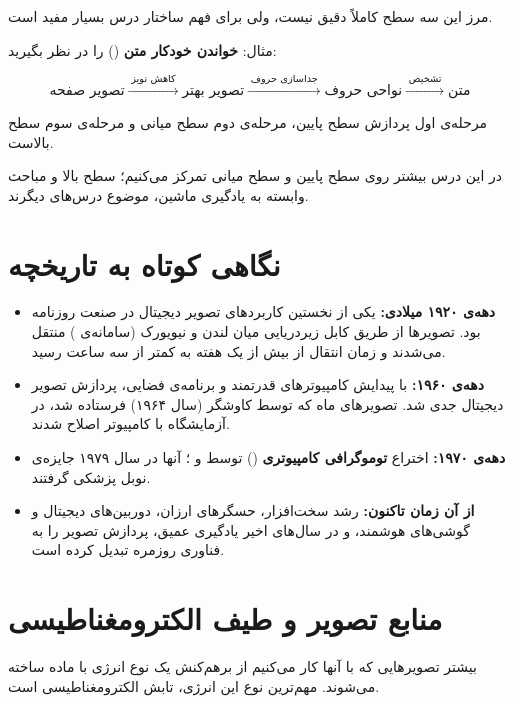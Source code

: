 \documentclass[11pt,a4paper]{article}
\begin{document}
	مرز این سه سطح کاملاً دقیق نیست، ولی برای فهم ساختار درس بسیار مفید است.
	
	مثال: \textbf{خواندن خودکار متن} () را در نظر بگیرید:
	
	\[
	\boxed{
		\text{تصویر صفحه}
		\xrightarrow{\;\text{کاهش نویز}\;}
		\text{تصویر بهتر}
		\xrightarrow{\;\text{جداسازی حروف}\;}
		\text{نواحی حروف}
		\xrightarrow{\;\text{تشخیص}\;}
		\text{متن}
	}
	\]
	
	مرحله‌ی اول پردازش سطح پایین، مرحله‌ی دوم سطح میانی و مرحله‌ی سوم سطح بالاست.
	
	در این درس بیشتر روی سطح پایین و سطح میانی تمرکز می‌کنیم؛
	سطح بالا و مباحث وابسته به یادگیری ماشین، موضوع درس‌های دیگرند.
	
	
	\section{نگاهی کوتاه به تاریخچه}
	
	\begin{itemize}
		\item \textbf{دهه‌ی ۱۹۲۰ میلادی:} یکی از نخستین کاربردهای تصویر دیجیتال در صنعت روزنامه بود.
		تصویرها از طریق کابل زیردریایی میان لندن و نیویورک (سامانه‌ی ) منتقل می‌شدند
		و زمان انتقال از بیش از یک هفته به کمتر از سه ساعت رسید.
		\item \textbf{دهه‌ی ۱۹۶۰:} با پیدایش کامپیوترهای قدرتمند و برنامه‌ی فضایی،
		پردازش تصویر دیجیتال جدی شد. تصویرهای ماه که توسط کاوشگر  (سال ۱۹۶۴)
		فرستاده شد، در آزمایشگاه  با کامپیوتر اصلاح شدند.
		\item \textbf{دهه‌ی ۱۹۷۰:} اختراع \textbf{توموگرافی کامپیوتری} ()
		توسط  و ؛ آنها در سال ۱۹۷۹ جایزه‌ی نوبل پزشکی گرفتند.
		\item \textbf{از آن زمان تاکنون:} رشد سخت‌افزار، حسگرهای ارزان، دوربین‌های دیجیتال و گوشی‌های هوشمند،
		و در سال‌های اخیر یادگیری عمیق، پردازش تصویر را به فناوری روزمره تبدیل کرده است.
	\end{itemize}
	
	
	\section{منابع تصویر و طیف الکترومغناطیسی}
	
	بیشتر تصویرهایی که با آنها کار می‌کنیم از برهم‌کنش یک نوع انرژی با ماده ساخته می‌شوند.
	مهم‌ترین نوع این انرژی، تابش الکترومغناطیسی است.
	
\end{document}
